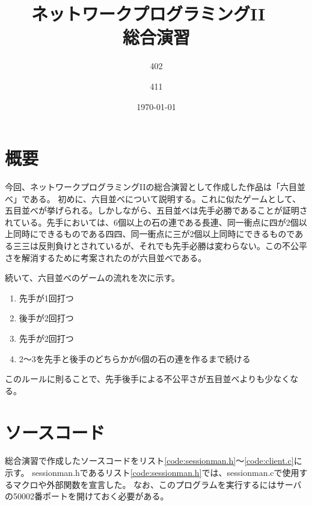 \documentclass[a4j, titlepage, 10pt]{jsarticle}
\begin{document}
\title{{ \Huge ネットワークプログラミングII }~\\{ \LARGE 総合演習 }}
\author{{ \Large 402 } \and { \Large 411 }}
\date{\today}
\maketitle

\section{概要}

今回、ネットワークプログラミングIIの総合演習として作成した作品は「六目並べ」である。
初めに、六目並べについて説明する。これに似たゲームとして、五目並べが挙げられる。しかしながら、五目並べは先手必勝であることが証明されている。先手においては、6個以上の石の連である長連、同一衝点に四が2個以上同時にできるものである四四、同一衝点に三が2個以上同時にできるものである三三は反則負けとされているが、それでも先手必勝は変わらない。この不公平さを解消するために考案されたのが六目並べである。

続いて、六目並べのゲームの流れを次に示す。
\begin{enumerate}
  \item 先手が1回打つ
  \item 後手が2回打つ
  \item 先手が2回打つ
  \item 2〜3を先手と後手のどちらかが6個の石の連を作るまで続ける
\end{enumerate}
このルールに則ることで、先手後手による不公平さが五目並べよりも少なくなる。

\section{ソースコード}

総合演習で作成したソースコードをリスト\ref{code:sessionman.h}～\ref{code:client.c}に示す。
sessionman.hであるリスト\ref{code:sessionman.h}では、sessionman.cで使用するマクロや外部関数を宣言した。
なお、このプログラムを実行するにはサーバの50002番ポートを開けておく必要がある。

\lstset{ numbers = left }

\end{document}
